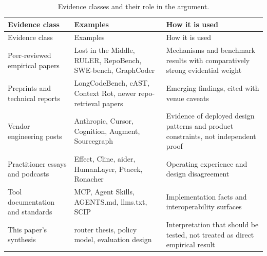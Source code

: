 \documentclass[
  11pt,
  letterpaper,
  numbers=noendperiod,
  parskip=half]{scrartcl}
\begin{document}
\begin{longtable}[]{@{}
  >{\raggedright\arraybackslash}p{}
  >{\raggedright\arraybackslash}p{}
  >{\raggedright\arraybackslash}p{}@{}}
\caption{Evidence classes and their role in the
argument.}\label{tbl-evidence}\tabularnewline
\toprule\noalign{}
\begin{minipage}[b]{\linewidth}\raggedright
Evidence class
\end{minipage} & \begin{minipage}[b]{\linewidth}\raggedright
Examples
\end{minipage} & \begin{minipage}[b]{\linewidth}\raggedright
How it is used
\end{minipage} \\
\midrule\noalign{}
\endfirsthead
\toprule\noalign{}
\begin{minipage}[b]{\linewidth}\raggedright
Evidence class
\end{minipage} & \begin{minipage}[b]{\linewidth}\raggedright
Examples
\end{minipage} & \begin{minipage}[b]{\linewidth}\raggedright
How it is used
\end{minipage} \\
\midrule\noalign{}
\endhead
\bottomrule\noalign{}
\endlastfoot
Peer-reviewed empirical papers & Lost in the Middle, RULER, RepoBench,
SWE-bench, GraphCoder & Mechanisms and benchmark results with
comparatively strong evidential weight \\
Preprints and technical reports & LongCodeBench, cAST, Context Rot,
newer repo-retrieval papers & Emerging findings, cited with venue
caveats \\
Vendor engineering posts & Anthropic, Cursor, Cognition, Augment,
Sourcegraph & Evidence of deployed design patterns and product
constraints, not independent proof \\
Practitioner essays and podcasts & Effect, Cline, aider, HumanLayer,
Ptacek, Ronacher & Operating experience and design disagreement \\
Tool documentation and standards & MCP, Agent Skills, AGENTS.md,
llms.txt, SCIP & Implementation facts and interoperability surfaces \\
This paper's synthesis & router thesis, policy model, evaluation design
& Interpretation that should be tested, not treated as direct empirical
result \\
\end{longtable}
\end{document}

